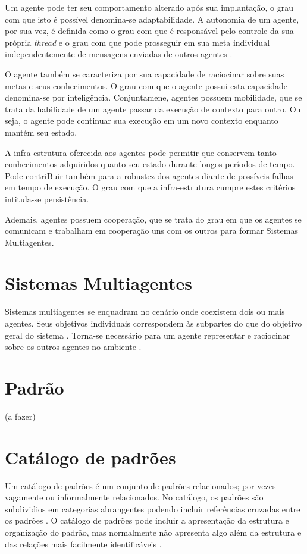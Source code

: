 Um agente pode ter seu comportamento alterado após sua implantação, o grau com que isto é possível denomina-se adaptabilidade. A autonomia de um agente, por sua vez, é definida como o grau com que é responsável pelo controle da sua própria \textit{thread} e o grau com que pode prosseguir em sua meta individual independentemente de mensagens enviadas de outros agentes \cite{griss2001software}.

O agente também se caracteriza por sua capacidade de raciocinar sobre suas metas e seus conhecimentos. O grau com que o agente possui esta capacidade denomina-se por inteligência. Conjuntamene, agentes possuem mobilidade, que se trata da habilidade de um agente passar da execução de contexto para outro. Ou seja, o agente pode continuar sua execução em um novo contexto enquanto mantém seu estado.

A infra-estrutura oferecida aos agentes pode permitir que conservem tanto conhecimentos adquiridos quanto seu estado durante longos períodos de tempo. Pode contriBuir também para a robustez dos agentes diante de possíveis falhas em tempo de execução. O grau com que a infra-estrutura cumpre estes critérios intitula-se persistência.

Ademais, agentes possuem cooperação, que se trata do grau em que os agentes se comunicam e trabalham em cooperação uns com os outros para formar Sistemas Multiagentes.

\section{Sistemas Multiagentes}

Sistemas multiagentes se enquadram no cenário onde coexistem dois ou mais agentes. Seus objetivos individuais  correspondem às subpartes do que do objetivo geral do sistema \cite{mcarthur2007multi}. Torna-se necessário para um agente representar e raciocinar sobre os outros agentes no ambiente \cite[pág. 887]{van2008handbook}. 


\section{Padrão}

(a fazer)

\section{Catálogo de padrões}

Um catálogo de padrões é um conjunto de padrões relacionados; por vezes vagamente ou informalmente relacionados. No catálogo, os padrões são subdividios em categorias abrangentes podendo incluir referências cruzadas entre os padrões \cite{appleton1997}. O catálogo de padrões pode incluir a apresentação da estrutura e organização do padrão, mas normalmente não apresenta algo além da estrutura e das relações mais  facilmente identificáveis \cite{appleton1997}.

